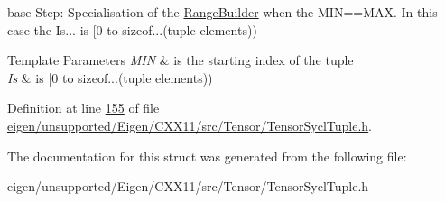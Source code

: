 base Step\+: Specialisation of the \hyperlink{structutility_1_1tuple_1_1_range_builder}{Range\+Builder} when the M\+IN==M\+AX. In this case the Is... is \mbox{[}0 to sizeof...(tuple elements)) 


\begin{DoxyTemplParams}{Template Parameters}
{\em M\+IN} & is the starting index of the tuple \\
\hline
{\em Is} & is \mbox{[}0 to sizeof...(tuple elements)) \\
\hline
\end{DoxyTemplParams}


Definition at line \hyperlink{eigen_2unsupported_2_eigen_2_c_x_x11_2src_2_tensor_2_tensor_sycl_tuple_8h_source_l00155}{155} of file \hyperlink{eigen_2unsupported_2_eigen_2_c_x_x11_2src_2_tensor_2_tensor_sycl_tuple_8h_source}{eigen/unsupported/\+Eigen/\+C\+X\+X11/src/\+Tensor/\+Tensor\+Sycl\+Tuple.\+h}.



The documentation for this struct was generated from the following file\+:\begin{DoxyCompactItemize}
\item 
eigen/unsupported/\+Eigen/\+C\+X\+X11/src/\+Tensor/\+Tensor\+Sycl\+Tuple.\+h\end{DoxyCompactItemize}

